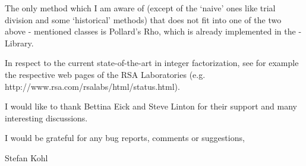 The only method which I am aware of (except of the \lq naive' ones like
trial division and some \lq historical' methods) 
that does not fit into one of the two above - mentioned
classes is Pollard's Rho, 
which is already implemented in the {\GAP} - Library.

In respect to the current state-of-the-art in integer factorization,
see for example the respective web pages of the 
RSA Laboratories
(e.g. http://www.rsa.com/rsalabs/html/status.html).

I would like to thank Bettina Eick and Steve Linton for their support
and many interesting discussions.

I would be grateful for any bug reports, comments or suggestions,

\vfill

\hfill                 Stefan Kohl

